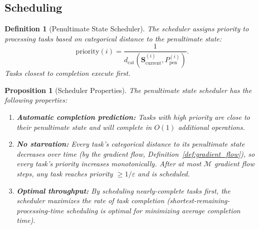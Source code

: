 \documentclass[twocolumn,10pt]{article}
\newtheorem{proposition}[theorem]{Proposition}
\newtheorem{definition}[theorem]{Definition}
\theoremstyle{remark}
\newcommand{\Depth}{\mathcal{M}}
\newcommand{\eps}{\varepsilon}
\newcommand{\Scoord}{\mathbf{S}}
\begin{document}
\subsection{Scheduling}

\begin{definition}[Penultimate State Scheduler]
\label{def:scheduler}
The scheduler assigns priority to processing tasks based on categorical distance to the penultimate state:
\begin{equation}
\mathrm{priority}(i) = \frac{1}{d_{\mathrm{cat}}(\Scoord_{\mathrm{current}}^{(i)}, P_{\mathrm{pen}}^{(i)})}.
\label{eq:priority}
\end{equation}
Tasks closest to completion execute first.
\end{definition}

\begin{proposition}[Scheduler Properties]
\label{prop:scheduler}
The penultimate state scheduler has the following properties:
\begin{enumerate}
\item \textbf{Automatic completion prediction:} Tasks with high priority are close to their penultimate state and will complete in $O(1)$ additional operations.
\item \textbf{No starvation:} Every task's categorical distance to its penultimate state decreases over time (by the gradient flow, Definition~\ref{def:gradient_flow}), so every task's priority increases monotonically. After at most $\Depth$ gradient flow steps, any task reaches priority $\geq 1/\eps$ and is scheduled.
\item \textbf{Optimal throughput:} By scheduling nearly-complete tasks first, the scheduler maximizes the rate of task completion (shortest-remaining-processing-time scheduling is optimal for minimizing average completion time).
\end{enumerate}
\end{proposition}
\end{document}
